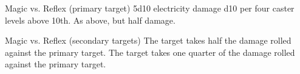 \begin{spellheader}
    \begin{spelltargetinginfo}
    \end{spelltargetinginfo}
    \begin{spelleffects}
        \spellrng{\rngmed}
    \end{spelleffects}
\end{spellheader}
\begin{spellcontent}
    \begin{spellattack}{Magic vs. Reflex (primary target)}
        \spellsuccess 5d10 electricity damage \add d10 per four caster levels above 10th. 
        \spellfailure As above, but half damage.
    \end{spellattack}
    \begin{spellattack}{Magic vs. Reflex (secondary targets)}
        \spellsuccess The target takes half the damage rolled against the primary target.
        \spellfailure The target takes one quarter of the damage rolled against the primary target.
    \end{spellattack}
\end{spellcontent}
\begin{spellfooter}

\end{spellfooter}

